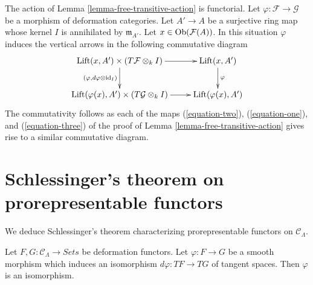 \begin{remark}
\label{remark-free-transitive-action-functorial}
The action of Lemma \ref{lemma-free-transitive-action} is functorial.
Let $\varphi : \mathcal{F} \to \mathcal{G}$ be a morphism of deformation
categories. Let $A' \to A$ be a surjective ring map whose kernel $I$
is annihilated by $\mathfrak m_{A'}$. Let
$x \in \mathop{\mathrm{Ob}}\nolimits(\mathcal{F}(A))$.
In this situation $\varphi$ induces the vertical arrows
in the following commutative diagram
$$
\xymatrix{
\text{Lift}(x, A') \times (T\mathcal{F} \otimes_k I)
\ar[d]_{(\varphi, d\varphi \otimes \text{id}_I)} \ar[r] &
\text{Lift}(x, A') \ar[d]^\varphi \\
\text{Lift}(\varphi(x), A') \times (T\mathcal{G} \otimes_k I) \ar[r] &
\text{Lift}(\varphi(x), A')
}
$$
The commutativity follows as each of the maps
(\ref{equation-two}), (\ref{equation-one}), and (\ref{equation-three})
of the proof of
Lemma \ref{lemma-free-transitive-action}
gives rise to a similar commutative diagram.
\end{remark}






\section{Schlessinger's theorem on prorepresentable functors}
\label{section-schlessingers-theorem}

\noindent
We deduce Schlessinger's theorem characterizing prorepresentable functors on
$\mathcal{C}_\Lambda$.

\begin{lemma}
\label{lemma-minimal-smooth-morphism-functors}
Let $F, G: \mathcal{C}_\Lambda \to \textit{Sets}$ be deformation
functors. Let $\varphi : F \to G$ be a smooth morphism which induces
an isomorphism $d\varphi : TF \to TG$ of tangent
spaces. Then $\varphi$ is an isomorphism.
\end{lemma}

